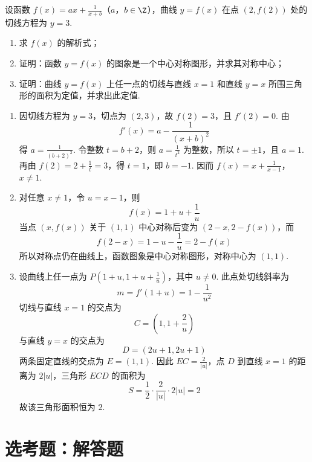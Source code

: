 \begin{problem}
设函数 \(f(x) = ax + \frac{1}{x + b}\)（\(a\)，\(b \in \Z\)），曲线 \(y = f(x)\) 在点 \((2, f(2))\) 处的切线方程为 \(y = 3\).

\begin{enumerate}
\item 求 \(f(x)\) 的解析式；
\item 证明：函数 \(y = f(x)\) 的图象是一个中心对称图形，并求其对称中心；
\item 证明：曲线 \(y = f(x)\) 上任一点的切线与直线 \(x = 1\) 和直线 \(y = x\) 所围三角形的面积为定值，并求出此定值.
\end{enumerate}

\begin{solution}
\begin{enumerate}
\item 因切线方程为 \(y=3\)，切点为 \(\left(2,3\right)\)，故 \(f(2)=3\)，且 \(f'(2)=0\). 由
\[
f'(x)=a-\frac{1}{\left(x+b\right)^2}
\]
得 \(a=\frac{1}{\left(b+2\right)^2}\). 令整数 \(t=b+2\)，则 \(a=\frac{1}{t^2}\) 为整数，所以 \(t=\pm1\)，且 \(a=1\). 再由 \(f(2)=2+\frac{1}{t}=3\)，得 \(t=1\)，即 \(b=-1\). 因而
\(f(x)=x+\frac{1}{x-1}\)，\(x\ne1\).
\item 对任意 \(x\ne1\)，令 \(u=x-1\)，则
\[
f(x)=1+u+\frac1u
\]
当点 \(\left(x,f(x)\right)\) 关于 \(\left(1,1\right)\) 中心对称后变为 \(\left(2-x,2-f(x)\right)\)，而
\[
f(2-x)=1-u-\frac1u=2-f(x)
\]
所以对称点仍在曲线上，函数图象是中心对称图形，对称中心为 \(\left(1,1\right)\).
\item 设曲线上任一点为 \(P\left(1+u,1+u+\frac1u\right)\)，其中 \(u\ne0\). 此点处切线斜率为
\[
m=f'(1+u)=1-\frac1{u^2}
\]
切线与直线 \(x=1\) 的交点为
\[
C=\left(1,1+\frac2u\right)
\]
与直线 \(y=x\) 的交点为
\[
D=\left(2u+1,2u+1\right)
\]
两条固定直线的交点为 \(E=\left(1,1\right)\). 因此 \(EC=\frac2{|u|}\)，点 \(D\) 到直线 \(x=1\) 的距离为 \(2|u|\)，三角形 \(ECD\) 的面积为
\[
S=\frac12\cdot\frac2{|u|}\cdot2|u|=2
\]
故该三角形面积恒为 \(2\).
\end{enumerate}
\end{solution}
\end{problem}

\section{选考题：解答题}

